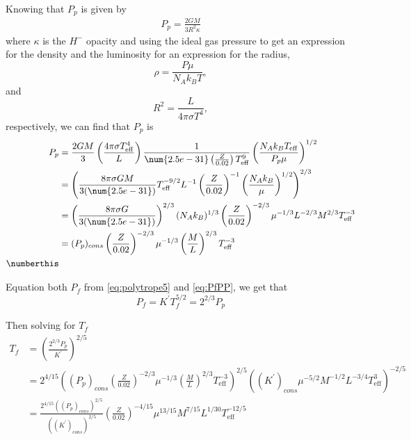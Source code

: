 Knowing that $P_p$ is given by 
\begin{align*}
    P_p = \frac{2GM}{3R^2\kappa}
\end{align*}
where $\kappa$ is the $H^-$ opacity and using the ideal gas pressure to get an expression for the density and the luminosity for an expression for the radius, 
\begin{equation}
    \rho = \frac{P\mu}{N_A k_B T},
    \label{eq:density5}
\end{equation}
 and 
\begin{equation}
    R^2=\frac{L}{4\pi\sigma T^4},
    \label{eq:radius5}
\end{equation} 
respectively, we can find that $P_p$ is
\begin{align*}
    P_p &= \frac{2 GM}{3} \left(\frac{4\pi\sigma T_{\mathrm{eff}}^4}{L}\right) \frac{1}{\num{2.5e-31}\left(\frac{Z}{0.02}\right)T_{\mathrm{eff}}^9}\left(\frac{N_Ak_B T_{\mathrm{eff}}}{P_p\mu}\right)^{1/2} \\
    &= \left(\frac{8\pi\sigma GM}{3(\num{2.5e-31})} T_{\mathrm{eff}}^{-9/2} L^{-1} \left(\frac{Z}{0.02}\right)^{-1} \left(\frac{N_Ak_B}{\mu}\right)^{1/2}\right)^{2/3}\\
    &= \left(\frac{8\pi\sigma G}{3(\num{2.5e-31})}\right)^{2/3}(N_A k_B)^{1/3}\left(\frac{Z}{0.02}\right)^{-2/3} \mu^{-1/3} L^{-2/3} M^{2/3} T_{\mathrm{eff}}^{-3}\\
    &= (P_p)_{cons} \left(\frac{Z}{0.02}\right)^{-2/3} \mu^{-1/3} \left(\frac{M}{L}\right)^{2/3}  T_{\mathrm{eff}}^{-3}\\
    \numberthis\label{eq:Pp5}
\end{align*}

Equation both $P_f$ from \ref{eq:polytrope5} and \ref{eq:PfPP}, we get that
\begin{equation}
    P_f = K^\prime T_f^{5/2} = 2^{2/3}P_p
    \label{eq:Pf5}
\end{equation}

Then solving for $T_f$
\begin{align*}
    T_f &= \left(\frac{2^{2/3}P_p}{K^\prime}\right)^{2/5} \\
    &= 2^{4/15}\left((P_p)_{cons} \left(\frac{Z}{0.02}\right)^{-2/3} \mu^{-1/3} \left(\frac{M}{L}\right)^{2/3}  T_{\mathrm{eff}}^{-3}\right)^{2/5}\left((K^\prime)_{cons}\mu^{-5/2} M^{-1/2} L^{-3/4} T_{\mathrm{eff}}^3\right)^{-2/5}\\
    &= \frac{2^{4/15}((P_p)_{cons})^{2/5}}{((K^\prime)_{cons})^{2/5}}\left(\frac{Z}{0.02}\right)^{-4/15}\mu^{13/15}M^{7/15}L^{1/30}T_{\mathrm{eff}}^{-12/5}\\
\end{align*}


